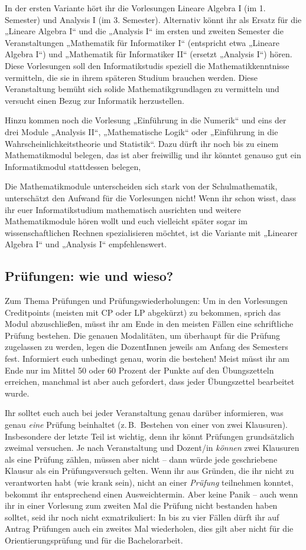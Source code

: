 In der ersten Variante hört ihr die Vorlesungen Lineare Algebra I (im 1.
Semester) und Analysis I (im 3. Semester). Alternativ könnt ihr als Ersatz für
die „Lineare Algebra I“ und die „Analysis I“ im ersten und zweiten Semester die
Veranstaltungen „Mathematik für Informatiker I“ (entspricht etwa „Lineare Algebra I“)
und „Mathematik für Informatiker II“ (ersetzt „Analysis I“) hören.
Diese Vorlesungen soll den Informatikstudis speziell die Mathematikkenntnisse
vermitteln, die sie in ihrem späteren Studium brauchen werden. Diese
Veranstaltung bemüht sich solide
Mathematikgrundlagen zu vermitteln und versucht einen Bezug zur Informatik herzustellen.

Hinzu kommen noch die Vorlesung „Einführung in die Numerik“ und eins der drei Module
„Analysis II“, „Mathematische Logik“ oder „Einführung in die Wahrscheinlichkeitstheorie und Statistik“.
Dazu dürft ihr noch bis zu einem Mathematikmodul belegen, das ist aber freiwillig
und ihr könntet genauso gut ein Informatikmodul stattdessen belegen,

Die Mathematikmodule unterscheiden sich stark von der Schulmathematik,
unterschätzt den Aufwand für die Vorlesungen nicht! Wenn ihr schon wisst, dass
ihr euer Informatikstudium mathematisch ausrichten und weitere Mathematikmodule
hören wollt und euch vielleicht später sogar im wissenschaftlichen Rechnen spezialisieren
möchtet, ist die Variante mit „Linearer Algebra I“ und „Analysis I“ empfehlenswert.


\subsection{Prüfungen: wie und wieso?}

Zum Thema Prüfungen und Prüfungswiederholungen: Um in den Vorlesungen
Creditpoints (meisten mit CP oder LP abgekürzt) zu bekommen, sprich das Modul abzuschließen,
müsst ihr am Ende in den meisten Fällen eine schriftliche Prüfung bestehen.
Die genauen Modalitäten, um überhaupt für die Prüfung zugelassen zu werden, legen die
DozentInnen jeweils am Anfang des Semesters fest. Informiert euch unbedingt genau,
worin die bestehen! Meist müsst ihr am Ende nur im Mittel 50 oder 60 Prozent
der Punkte auf den Übungszetteln erreichen, manchmal ist aber auch gefordert,
dass jeder Übungszettel bearbeitet wurde.

Ihr solltet euch auch bei jeder Veranstaltung genau darüber informieren, was
genau \emph{eine} Prüfung beinhaltet (z.\,B.\ Bestehen von einer von zwei
Klausuren). Insbesondere der letzte Teil ist wichtig, denn ihr könnt Prüfungen
grundsätzlich zweimal versuchen. Je nach Veranstaltung und Dozent/in
\emph{können} zwei Klausuren als eine Prüfung zählen, müssen aber nicht -- dann
würde jede geschriebene Klausur als ein Prüfungsversuch gelten. Wenn ihr aus
Gründen, die ihr nicht zu verantworten habt (wie krank sein), nicht an einer
\emph{Prüfung} teilnehmen konntet, bekommt ihr entsprechend einen Ausweichtermin.
Aber keine Panik -- auch wenn ihr in einer Vorlesung zum zweiten Mal die
Prüfung nicht bestanden haben solltet, seid ihr noch nicht exmatrikuliert: In
bis zu vier Fällen dürft ihr auf Antrag Prüfungen auch ein zweites Mal
wiederholen, dies gilt aber nicht für die Orientierungsprüfung und für die
Bachelorarbeit.

